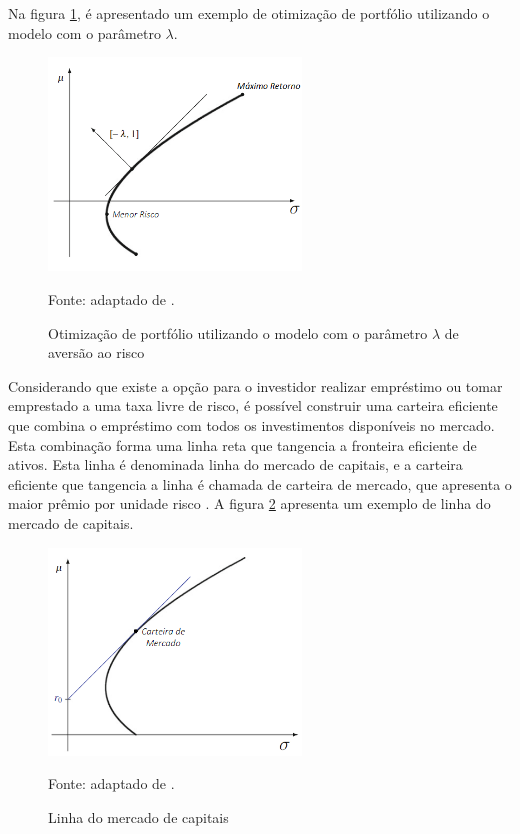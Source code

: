                     \ipar Na figura \ref{fig:aversao}, é apresentado um exemplo de otimização de portfólio utilizando o modelo com o parâmetro $\lambda$.

                    \begin{figure}[htbp]
                        \centering
                        \caption{Otimização de portfólio utilizando o modelo com o parâmetro $\lambda$ de aversão ao risco}
                        \label{fig:aversao}
                        \includegraphics[width=0.6\textwidth]{imagens/aversao.png}
                        \par \footnotesize Fonte: adaptado de .
                    \end{figure}

                    \ipar Considerando que existe a opção para o investidor realizar empréstimo ou tomar emprestado a uma taxa livre de risco, é possível construir uma carteira eficiente que combina o empréstimo com todos os investimentos disponíveis no mercado. Esta combinação forma uma linha reta que tangencia a fronteira eficiente de ativos. Esta linha é denominada linha do mercado de capitais, e a carteira eficiente que tangencia a linha é chamada de carteira de mercado, que apresenta o maior prêmio por unidade risco \cite{sharpe1964capital}. A figura \ref{fig:carteira_de_mercado} apresenta um exemplo de linha do mercado de capitais.

                    \begin{figure}[htbp]
                        \centering
                        \caption{Linha do mercado de capitais}
                        \label{fig:carteira_de_mercado}
                        \includegraphics[width=0.6\textwidth]{imagens/carteira_de_mercado.png}
                        \par \footnotesize Fonte: adaptado de .
                    \end{figure}

